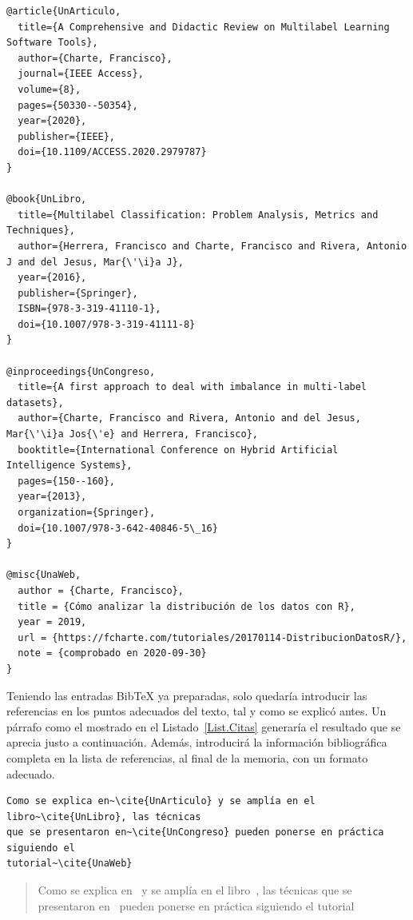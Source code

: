 \begin{lstlisting}[caption={Entradas BibTex de distintos tipos},label=List.BibTeX,language={[LaTeX]TeX}]
@article{UnArticulo,
  title={A Comprehensive and Didactic Review on Multilabel Learning Software Tools},
  author={Charte, Francisco},
  journal={IEEE Access},
  volume={8},
  pages={50330--50354},
  year={2020},
  publisher={IEEE},
  doi={10.1109/ACCESS.2020.2979787}
}

@book{UnLibro,
  title={Multilabel Classification: Problem Analysis, Metrics and Techniques},
  author={Herrera, Francisco and Charte, Francisco and Rivera, Antonio J and del Jesus, Mar{\'\i}a J},
  year={2016},
  publisher={Springer},
  ISBN={978-3-319-41110-1},
  doi={10.1007/978-3-319-41111-8}
}

@inproceedings{UnCongreso,
  title={A first approach to deal with imbalance in multi-label datasets},
  author={Charte, Francisco and Rivera, Antonio and del Jesus, Mar{\'\i}a Jos{\'e} and Herrera, Francisco},
  booktitle={International Conference on Hybrid Artificial Intelligence Systems},
  pages={150--160},
  year={2013},
  organization={Springer},
  doi={10.1007/978-3-642-40846-5\_16}
}

@misc{UnaWeb,
  author = {Charte, Francisco},
  title = {Cómo analizar la distribución de los datos con R},
  year = 2019,
  url = {https://fcharte.com/tutoriales/20170114-DistribucionDatosR/}, 
  note = {comprobado en 2020-09-30}
}
\end{lstlisting}

Teniendo las entradas BibTeX ya preparadas, solo quedaría introducir las referencias en los puntos adecuados del texto, tal y como se explicó antes. Un párrafo como el mostrado en el Listado~\ref{List.Citas} generaría el resultado que se aprecia justo a continuación. Además, introducirá la información bibliográfica completa en la lista de referencias, al final de la memoria, con un formato adecuado.

\begin{lstlisting}[caption={Párrafo en el que se citan varios trabajos},language={[LaTeX]TeX},label=List.Citas]
Como se explica en~\cite{UnArticulo} y se amplía en el libro~\cite{UnLibro}, las técnicas 
que se presentaron en~\cite{UnCongreso} pueden ponerse en práctica siguiendo el 
tutorial~\cite{UnaWeb}
\end{lstlisting}

\begin{quotation}
Como se explica en~\cite{UnArticulo} y se amplía en el libro~\cite{UnLibro}, las técnicas que se presentaron en~\cite{UnCongreso} pueden ponerse en práctica siguiendo el tutorial~\cite{UnaWeb}
\end{quotation}

